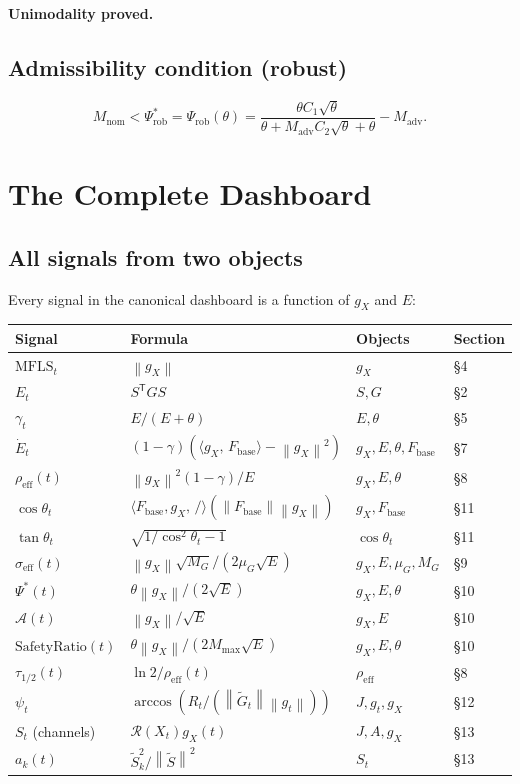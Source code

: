 \documentclass[11pt,a4paper]{article}
\theoremstyle{definition}
\newcommand{\T}{^{\mathsf{T}}}
\newcommand{\norm}[1]{\left\|#1\right\|}
\newcommand{\inner}[2]{\langle #1,\,#2\rangle}
\newcommand{\Fbase}{F_{\mathrm{base}}}
\newcommand{\gX}{g_X}
\newcommand{\mfls}{\mathrm{MFLS}}
\newcommand{\adv}{\mathrm{adv}}
\newcommand{\nom}{\mathrm{nom}}
\begin{document}
\textbf{Unimodality proved.}

\subsection{Admissibility condition (robust)}

\[
M_\nom < \Psi^*_\mathrm{rob} = \Psi_\mathrm{rob}(\theta) = \frac{\theta C_1\sqrt{\theta}}{\theta + M_\adv C_2\sqrt{\theta} + \theta} - M_\adv.
\]

\section{The Complete Dashboard}

\subsection{All signals from two objects}

Every signal in the canonical dashboard is a function of $\gX$ and $E$:

\begin{center}
\renewcommand{\arraystretch}{1.4}
\begin{tabular}{llll}
\toprule
Signal & Formula & Objects & Section \\
\midrule
$\mfls_t$ & $\norm{\gX}$ & $\gX$ & \S4 \\
$E_t$ & $S\T GS$ & $S, G$ & \S2 \\
$\gamma_t$ & $E/(E+\theta)$ & $E,\theta$ & \S5 \\
$\dot E_t$ & $(1-\gamma)(\inner{\gX}{\Fbase}-\norm{\gX}^2)$ & $\gX,E,\theta,\Fbase$ & \S7 \\
$\rho_\mathrm{eff}(t)$ & $\norm{\gX}^2(1-\gamma)/E$ & $\gX,E,\theta$ & \S8 \\
$\cos\theta_t$ & $\inner{\Fbase,\gX}/(\norm{\Fbase}\norm{\gX})$ & $\gX,\Fbase$ & \S11 \\
$\tan\theta_t$ & $\sqrt{1/\cos^2\theta_t - 1}$ & $\cos\theta_t$ & \S11 \\
$\sigma_\mathrm{eff}(t)$ & $\norm{\gX}\sqrt{M_G}/(2\mu_G\sqrt{E})$ & $\gX,E,\mu_G,M_G$ & \S9 \\
$\Psi^*(t)$ & $\theta\norm{\gX}/(2\sqrt{E})$ & $\gX,E,\theta$ & \S10 \\
$\mathcal{A}(t)$ & $\norm{\gX}/\sqrt{E}$ & $\gX,E$ & \S10 \\
$\mathrm{SafetyRatio}(t)$ & $\theta\norm{\gX}/(2M_\mathrm{max}\sqrt{E})$ & $\gX,E,\theta$ & \S10 \\
$\tau_{1/2}(t)$ & $\ln 2/\rho_\mathrm{eff}(t)$ & $\rho_\mathrm{eff}$ & \S8 \\
$\psi_t$ & $\arccos(R_t/(\norm{\tilde G_t}\norm{g_t}))$ & $J,g_t,\gX$ & \S12 \\
$S_t$ (channels) & $\mathcal{R}(X_t)\gX(t)$ & $J,A,\gX$ & \S13 \\
$a_k(t)$ & $\tilde S_k^2/\norm{\tilde S}^2$ & $S_t$ & \S13 \\
\bottomrule
\end{tabular}
\end{center}
\end{document}
